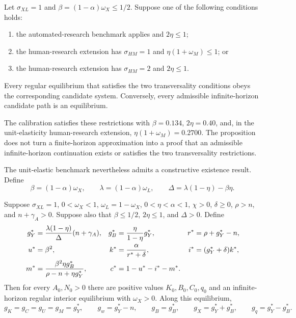 \begin{proposition}
\label{prop:axm-equilibrium-sufficiency}
Let \(\sigma_{XL}=1\) and
\(\beta=(1-\alpha)\omega_X\leq1/2\). Suppose one of the following conditions
holds:
\begin{enumerate}
 \item the automated-research benchmark applies and \(2\eta\leq1\);
 \item the human-research extension has
 \(\sigma_{HM}=1\) and \(\eta(1+\omega_M)\leq1\); or
 \item the human-research extension has
 \(\sigma_{HM}=2\) and \(2\eta\leq1\).
\end{enumerate}
Every regular equilibrium that satisfies the two transversality conditions
obeys the corresponding candidate system. Conversely, every admissible
infinite-horizon candidate path is an equilibrium.
\end{proposition}

The calibration satisfies these restrictions with \(\beta=0.134\),
\(2\eta=0.40\), and, in the unit-elasticity human-research extension,
\(\eta(1+\omega_M)=0.2700\). The proposition does not turn a finite-horizon
approximation into a proof that an admissible infinite-horizon continuation
exists or satisfies the two transversality restrictions.

The unit-elastic benchmark nevertheless admits a constructive existence result.
Define
\begin{equation}
 \beta=(1-\alpha)\omega_X,\qquad
 \lambda=(1-\alpha)\omega_L,\qquad
 \Delta=\lambda(1-\eta)-\beta\eta.
 \label{eq:axm-benchmark-existence-definitions}
\end{equation}

\begin{proposition}
\label{prop:axm-benchmark-equilibrium-existence}
Suppose \(\sigma_{XL}=1\), \(0<\omega_X<1\),
\(\omega_L=1-\omega_X\), \(0<\eta<\alpha<1\), \(\chi>0\),
\(\delta\geq0\), \(\rho>n\), and \(n+\gamma_A>0\). Suppose also that
\(\beta\leq1/2\), \(2\eta\leq1\), and \(\Delta>0\). Define
\begin{align}
 g_Y^*&=\frac{\lambda(1-\eta)}{\Delta}(n+\gamma_A),
 &g_B^*&=\frac{\eta}{1-\eta}g_Y^*,
 &r^*&=\rho+g_Y^*-n,
 \label{eq:axm-benchmark-existence-growth}\\
 u^*&=\beta^2,
 &k^*&=\frac{\alpha}{r^*+\delta},
 &i^*&=(g_Y^*+\delta)k^*,\notag\\
 m^*&=\frac{\beta^2\eta g_B^*}{\rho-n+\eta g_Y^*},
 &c^*&=1-u^*-i^*-m^*.
 \label{eq:axm-benchmark-existence-shares}
\end{align}
Then for every \(A_0,N_0>0\) there are positive values
\(K_0,B_0,C_0,q_0\) and an infinite-horizon regular interior equilibrium with
\(\omega_X>0\). Along this equilibrium,
\begin{equation}
 g_K=g_C=g_U=g_M=g_Y^*,\qquad
 g_w=g_Y^*-n,\qquad
 g_B=g_B^*,\qquad g_X=g_Y^*+g_B^*,\qquad
 g_q=g_Y^*-g_B^*.
 \label{eq:axm-benchmark-existence-path}
\end{equation}
\end{proposition}

